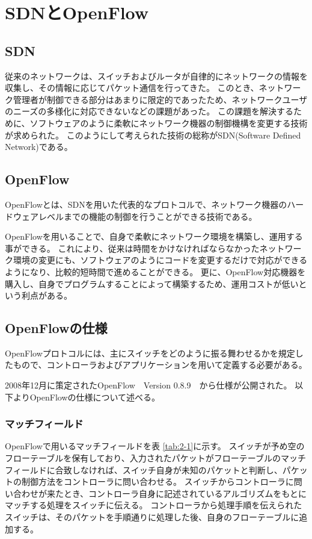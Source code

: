 \section{SDNとOpenFlow}

\subsection{SDN}

従来のネットワークは、スイッチおよびルータが自律的にネットワークの情報を収集し、その情報に応じてパケット通信を行ってきた\cite{openflownet}。
このとき、ネットワーク管理者が制御できる部分はあまりに限定的であったため、ネットワークユーザのニーズの多様化に対応できないなどの課題があった。
この課題を解決するために、ソフトウェアのように柔軟にネットワーク機器の制御機構を変更する技術が求められた。
このようにして考えられた技術の総称がSDN(Software Defined Network)である。

\subsection{OpenFlow}

OpenFlowとは、SDNを用いた代表的なプロトコルで、ネットワーク機器のハードウェアレベルまでの機能の制御を行うことができる技術である\cite{openflowjapanese}。

OpenFlowを用いることで、自身で柔軟にネットワーク環境を構築し、運用する事ができる。
これにより、従来は時間をかけなければならなかったネットワーク環境の変更にも、ソフトウェアのようにコードを変更するだけで対応ができるようになり、比較的短時間で進めることができる。
更に、OpenFlow対応機器を購入し、自身でプログラムすることによって構築するため、運用コストが低いという利点がある。

\subsection{OpenFlowの仕様}

OpenFlowプロトコルには、主にスイッチをどのように振る舞わせるかを規定したもので、コントローラおよびアプリケーションを用いて定義する必要がある。


2008年12月に策定されたOpenFlow　Version 0.8.9\cite{openflow}　から仕様が公開された。
以下よりOpenFlowの仕様について述べる。

\subsubsection{マッチフィールド}

OpenFlowで用いるマッチフィールドを表 \ref{tab:2-1}に示す\cite{openflow}。
スイッチが予め空のフローテーブルを保有しており、入力されたパケットがフローテーブルのマッチフィールドに合致しなければ、スイッチ自身が未知のパケットと判断し、パケットの制御方法をコントローラに問い合わせる。
スイッチからコントローラに問い合わせが来たとき、コントローラ自身に記述されているアルゴリズムをもとにマッチする処理をスイッチに伝える。
コントローラから処理手順を伝えられたスイッチは、そのパケットを手順通りに処理した後、自身のフローテーブルに追加する。

